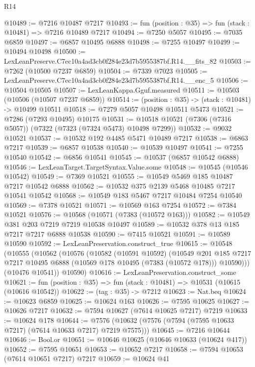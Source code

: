 \begin{lexlean}{R14}
\begin{coremodule}
@10489 := @7216 @10487 @7217
@10493 := fun (position : @35) => fun (stack : @10481) => @7216 @10489 @7217
@10494 := @7250 @5057
@10495 := @7035 @6859
@10497 := @6857 @10495 @6888
@10498 := @7255 @10497
@10499 := @10494 @10498
@10500 := LexLeanPreserve.C7ec10a4ad3cb0f284e23d7b5955387bf.R14.__fits_82
@10503 := @7262 (@10500 @7237 @6859)
@10504 := @7339 @7023
@10505 := LexLeanPreserve.C7ec10a4ad3cb0f284e23d7b5955387bf.R14.__enc_5
@10506 := @10504 @10505
@10507 := LexLeanKappa.Gguf.measured
@10511 := @10503 (@10506 (@10507 @7237 @6859))
@10514 := (position : @35) -> (stack : @10481) -> @10499 @10511
@10518 := @7279 @5057 @10498 @10511 @5473
@10521 := @7286 (@7293 @10495) @10175
@10531 := @10518 @10521 (@7306 (@7316 @5057)) (@7322 (@7323 (@7324 @5473) @10498 @7299))
@10532 := @9032 @10521
@10537 := @10532 @192 @4485 @5471 @10489 @7217
@10538 := @6863 @7217
@10539 := @6857 @10538
@10540 := @10539 @10497
@10541 := @7255 @10540
@10542 := @6856 @10541
@10545 := @10537 (@6857 @10542 @6888)
@10546 := LexLeanTarget.TargetSyntax.Value.some
@10548 := @10545 (@10546 @10542)
@10549 := @7369 @10521
@10555 := @10549 @5469 @185 @10487 @7217 @10542 @6888
@10562 := @10532 @375 @2139 @5468 @10485 @7217 @10541 @10542
@10568 := @10549 @183 @5467 @7217 @10484 @7254 @10540
@10569 := @7378 @10521
@10571 := @10569 @163 @7254
@10572 := @7384 @10521
@10576 := @10568 (@10571 (@7383 (@10572 @163)))
@10582 := @10549 @381 @203 @7219 @7219 @10538 @10497
@10589 := @10532 @378 @13 @185 @7217 @7217 @6888 @10538
@10590 := @7415 @10521
@10591 := @10589 @10590
@10592 := LexLeanPreservation.construct_true
@10615 := @10548
    (@10555
      (@10562
        (@10576
          (@10582
            (@10591 @10592)
            (@10549
              @201
              @185
              @7217
              @7217
              @10495
              @6888
              (@10569 @178 @10495 (@7383 (@10572 @178)))
              @10590)))
        (@10476 @10541))
      @10590)
@10616 := LexLeanPreservation.construct_some
@10621 := fun (position : @35) => fun (stack : @10481) => @10531 (@10615 (@10616 @10542))
@10622 := (tag : @35) -> @7212
@10623 := Nat.beq
@10624 := @10623 @6859
@10625 := @10624 @163
@10626 := @7595 @10625
@10627 := @10626 @7217
@10632 := @7594 @10627 (@7614 @10625 @7217) @7219
@10633 := @10624 @178
@10644 := @7576 (@10632 (@7576 (@7594 (@7595 @10633 @7217) (@7614 @10633 @7217) @7219 @7575)))
@10645 := @7216 @10644
@10646 := Bool.or
@10651 := @10646 @10625 (@10646 @10633 (@10624 @417))
@10652 := @7595 @10651
@10653 := @10652 @7217
@10658 := @7594 @10653 (@7614 @10651 @7217) @7217
@10659 := @10624 @41

\end{coremodule}
\end{lexlean}
